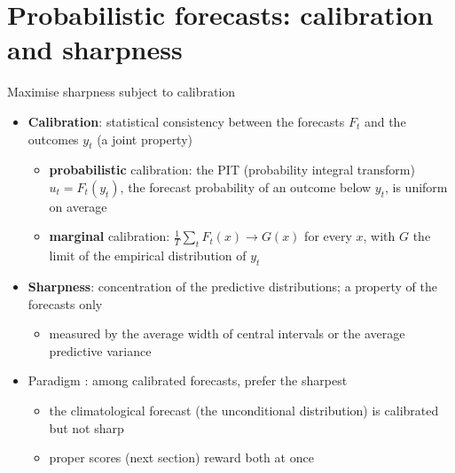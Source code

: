 \section{Probabilistic forecasts: calibration and sharpness}

\begin{frame}{Maximise sharpness subject to calibration}
\itemsize{\small}
\begin{itemize}
    \item \textbf{Calibration}: statistical consistency between the forecasts $F_t$ and the outcomes $y_t$ (a joint property) 
    \begin{itemize}
        \item \textbf{probabilistic} calibration: the PIT (probability integral transform) $u_t = F_t(y_t)$, the forecast probability of an outcome below $y_t$, is uniform on average
        \item \textbf{marginal} calibration: $\frac1T\sum_t F_t(x) \to G(x)$ for every $x$, with $G$ the limit of the empirical distribution of $y_t$
    \end{itemize}
    \item \textbf{Sharpness}: concentration of the predictive distributions; a property of the forecasts only
    \begin{itemize}
        \item measured by the average width of central intervals or the average predictive variance
    \end{itemize}
    \item Paradigm : among calibrated forecasts, prefer the sharpest
    \begin{itemize}
        \item the climatological forecast (the unconditional distribution) is calibrated but not sharp
        \item proper scores (next section) reward both at once
    \end{itemize}
\end{itemize}
\end{frame}

